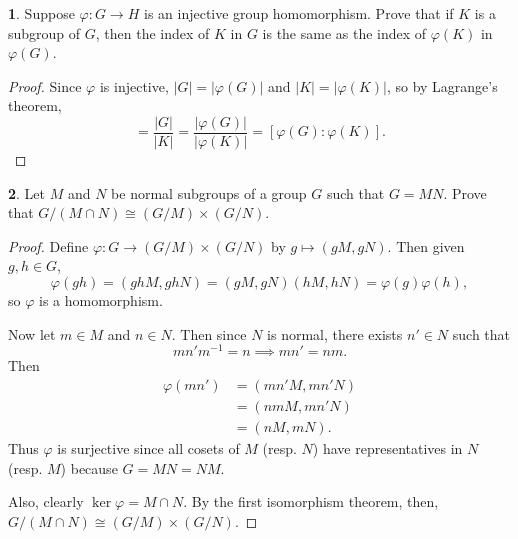 \documentclass[12pt]{article}
\theoremstyle{definition}
\newtheorem{ex}{}
\begin{document}
\begin{ex}
	Suppose $\varphi : G \to H$ is an injective group homomorphism.
	Prove that if $K$ is a subgroup of $G$, then the index of $K$ in $G$ is the same as the index of $\varphi(K)$ in $\varphi(G)$.
\end{ex}
\begin{proof}
	Since $\varphi$ is injective, $|G| = |\varphi(G)|$ and $|K| = |\varphi(K)|$, so by Lagrange's theorem, \begin{equation*}
		[G : K] = \frac{|G|}{|K|} = \frac{|\varphi(G)|}{|\varphi(K)|} = [\varphi(G) : \varphi(K)].
	\end{equation*}
\end{proof}

\begin{ex}
	Let $M$ and $N$ be normal subgroups of a group $G$ such that $G = MN$.
	Prove that $G/(M \cap N) \cong (G/M) \times (G/N)$.
\end{ex}
\begin{proof}
	Define $\varphi : G \to (G/M) \times (G/N)$ by $g \mapsto (gM, gN)$.
	Then given $g, h \in G$, \begin{equation*}
		\varphi(gh) = (ghM, ghN) = (gM, gN)(hM, hN) = \varphi(g)\varphi(h),
	\end{equation*}
	so $\varphi$ is a homomorphism.

	Now let $m \in M$ and $n \in N$.
	Then since $N$ is normal, there exists $n' \in N$ such that \begin{equation*}
		mn'm^{-1} = n \implies mn' = nm.
	\end{equation*}
	Then \begin{align*}
		\varphi(mn') & = (mn'M, mn'N) \\
		             & = (nmM, mn'N)  \\
		             & = (nM, mN).
	\end{align*}
	Thus $\varphi$ is surjective since all cosets of $M$ (resp. $N$) have representatives in $N$ (resp. $M$) because $G = MN = NM$.

	Also, clearly $\ker \varphi = M \cap N$.
	By the first isomorphism theorem, then, $G/(M \cap N) \cong (G/M) \times (G/N)$.
\end{proof}
\end{document}
